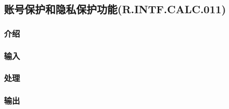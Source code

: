 \subsection{账号保护和隐私保护功能(R.INTF.CALC.011)}
\subsubsection{介绍}
\subsubsection{输入}
\subsubsection{处理}
\subsubsection{输出}